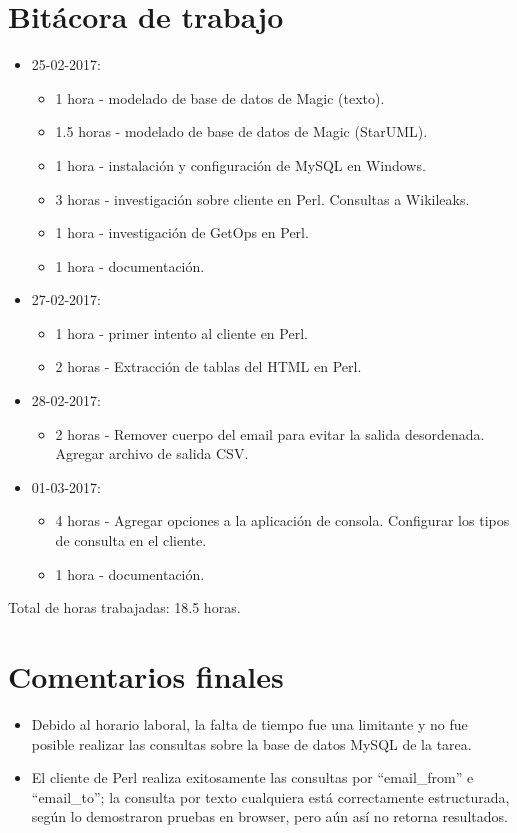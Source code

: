 \documentclass{article}
\begin{document}
\section{Bit\'acora de trabajo}
\begin{itemize}
  \item 25-02-2017:
  \begin{itemize}
    \item 1 hora - modelado de base de datos de Magic (texto).
    \item 1.5 horas - modelado de base de datos de Magic (StarUML).
    \item 1 hora - instalaci\'on y configuraci\'on de MySQL en Windows.
    \item 3 horas - investigaci\'on sobre cliente en Perl. Consultas a Wikileaks.
    \item 1 hora - investigaci\'on de GetOps en Perl.
    \item 1 hora - documentaci\'on.
  \end{itemize}
  \item 27-02-2017:
  \begin{itemize}
    \item 1 hora - primer intento al cliente en Perl.
    \item 2 horas - Extracci\'on de tablas del HTML en Perl.
  \end{itemize}
  \item 28-02-2017:
  \begin{itemize}
    \item 2 horas - Remover cuerpo del email para evitar la salida desordenada. Agregar archivo de salida CSV.
  \end{itemize}
  \item 01-03-2017:
  \begin{itemize}
    \item 4 horas - Agregar opciones a la aplicaci\'on de consola. Configurar los tipos de consulta en el cliente.
    \item 1 hora - documentaci\'on.
  \end{itemize}
\end{itemize}
Total de horas trabajadas: 18.5 horas.

\section{Comentarios finales}
\begin{itemize}
  \item Debido al horario laboral, la falta de tiempo fue una limitante y no fue posible realizar las consultas sobre la base de datos MySQL de la tarea.
  \item El cliente de Perl realiza exitosamente las consultas por ``email\_from'' e ``email\_to''; la consulta por texto cualquiera est\'a correctamente estructurada, seg\'un lo demostraron pruebas en browser, pero a\'un as\'i no retorna resultados.
\end{itemize}
\end{document}
